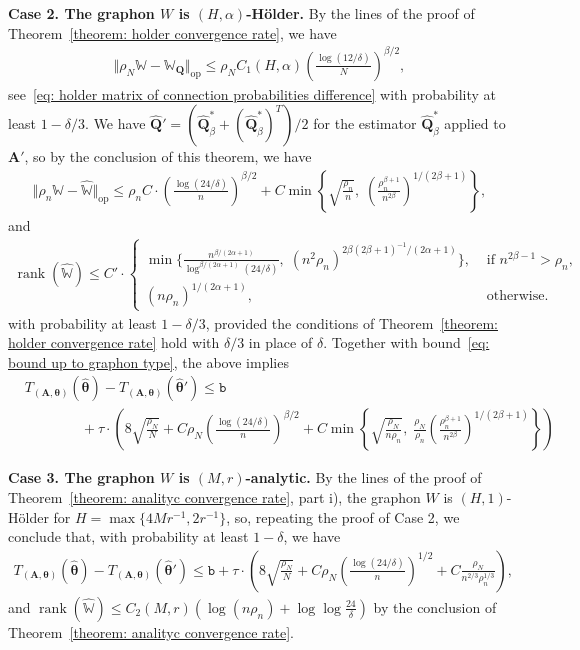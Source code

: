 \documentclass[11pt]{article}
\newcommand{\op}{\mathrm{op}}
\newcommand{\bA}{\bm{A}}
\newcommand{\bQ}{\bm{Q}}
\newcommand{\btheta}{\bm{\theta}}
\newcommand{\bbW}{\mathbb{W}}
\newcommand{\<}{\langle}
\renewcommand{\>}{\rangle}
\newcommand{\ttb}{\mathtt{b}}
\DeclareMathOperator{\rank}{rank}
\theoremstyle{plain}
\theoremstyle{definition}
\theoremstyle{remark}
\begin{document}
{\noindent \textbf{Case 2. The graphon $W$ is $(H, \alpha)$-H\"older.} By the lines of the proof of Theorem~\ref{theorem: holder convergence rate}, we have
\begin{align*}
    \Vert \rho_N \bbW - \bbW_{\bQ} \Vert_{\op} \le  \rho_N C_1(H, \alpha) \left (  \frac{\log(12/\delta)}{N}\right )^{\beta/2},
\end{align*}
see~\eqref{eq: holder matrix of connection probabilities difference} with probability at least $1 - \delta/3$. We have $\widehat{\bQ}' = (\widehat{\bQ}^*_{\beta} + (\widehat{\bQ}^*_{\beta})^{T})/2$ for the estimator $\widehat{\bQ}^*_{\beta}$ applied to $\bA'$, so by the conclusion of this theorem, we have
\begin{align*}
    \Vert \rho_n \bbW - \widehat{\bbW} \Vert_{\op} \le \rho_n  C \cdot \left ( \frac{\log (24 /\delta)}{n} \right )^{\beta/2} + C \min \left \{\sqrt{\frac{\rho_n}{n}}, \; \left ( \frac{\rho_n^{\beta + 1}}{n^{2 \beta}} \right )^{1/(2 \beta + 1)} \right \},
\end{align*}
and
\begin{align*}
    \rank(\widehat{\bbW}) \le C' \cdot \begin{cases}
            \min \Big \{\frac{n^{\beta/(2 \alpha + 1)}}{\log^{\beta/(2 \alpha + 1)}(24/\delta)}, \; (n^2 \rho_n)^{2\beta (2 \beta + 1)^{-1} / (2\alpha + 1)} \Big \}, & \text{ if } n^{2 \beta - 1} > \rho_n, \\
            (n \rho_n)^{1/(2 \alpha + 1)}, & \text{ otherwise.}
        \end{cases}
\end{align*}
with probability at least $1 - \delta/3$, provided the conditions of Theorem~\ref{theorem: holder convergence rate} hold with $\delta/3$ in place of $\delta$.  Together with bound~\eqref{eq: bound up to graphon type}, the above implies
\begin{align*}
    & T_{(\bA, \btheta)}(\hat{\btheta}) - T_{(\bA, \btheta)}(\hat{\btheta}') \le \ttb  \\
    & \qquad \qquad + \tau \cdot \left ( 8 \sqrt{\frac{\rho_N}{N}} + C \rho_N \left ( \frac{\log (24 /\delta)}{n} \right )^{\beta/2} + C \min \left \{\sqrt{\frac{\rho_N}{n \rho_n}}, \; \frac{\rho_N}{\rho_n}\left ( \frac{\rho_n^{\beta + 1}}{n^{2 \beta}} \right )^{1/(2 \beta + 1)} \right \} \right )
\end{align*}

\noindent \textbf{Case 3. The graphon $W$ is $(M, r)$-analytic.} By the lines of the proof of Theorem~\ref{theorem: analityc convergence rate}, part i), the graphon $W$ is $(H, 1)$-H\"older for $H = \max \{4 M r^{-1}, 2 r^{-1}\}$, so, repeating the proof of Case 2, we conclude that, with probability at least $1 - \delta$, we have
\begin{align*}
     T_{(\bA, \btheta)}(\hat{\btheta}) - T_{(\bA, \btheta)}(\hat{\btheta}') \le \ttb  + \tau \cdot \left ( 8 \sqrt{\frac{\rho_N}{N}} + C \rho_N \left ( \frac{\log (24 /\delta)}{n} \right )^{1/2} + C \frac{\rho_N}{n^{2/3} \rho_n^{1/3}} \right ),
\end{align*}
and $\rank(\widehat{\bbW}) \le C_2(M, r) (\log (n \rho_n) + \log \log \frac{24}{\delta})$ by the conclusion of Theorem~\ref{theorem: analityc convergence rate}.


}
\end{document}
